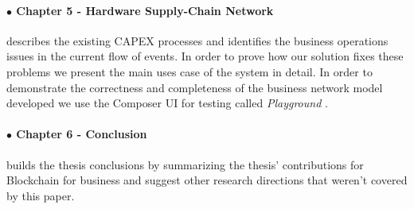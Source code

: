 \paragraph{$\bullet$ Chapter 5 - Hardware Supply-Chain Network} describes the existing CAPEX processes and identifies the business operations issues in the current flow of events. In order to prove how our solution fixes these problems we present the main uses case of the system in detail. In order to demonstrate the correctness and completeness of the business network model developed we use the Composer UI for testing called \emph{Playground} \cite{composer-playground}. 

\paragraph{$\bullet$ Chapter 6 - Conclusion} builds the thesis conclusions by summarizing the thesis' contributions for Blockchain for business and suggest other research directions that weren't covered by this paper.















